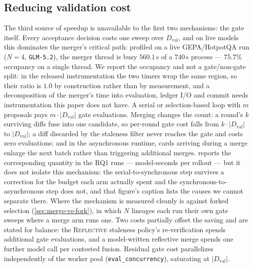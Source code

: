 \documentclass{article}
\newcommand{\code}[1]{\texttt{#1}}
\newcommand{\Dval}{D_{\mathrm{val}}}
\begin{document}
\subsection{Reducing validation cost}
\label{sec:lever-val}
The third source of speedup is unavailable to the first two mechanisms: the gate itself. Every acceptance decision costs one sweep over $\Dval$, and on live models this dominates the merger's critical path: profiled on a live GEPA/HotpotQA run ($N{=}4$, \code{GLM-5.2}), the merger thread is busy $560.1$\,s of a $740$\,s process --- $75.7\%$ occupancy on a single thread. We report the occupancy and not a gate/non-gate split: in the released instrumentation the two timers wrap the same region, so their ratio is $1.0$ by construction rather than by measurement, and a decomposition of the merger's time into evaluation, ledger I/O and commit needs instrumentation this paper does not have. A serial or selection-based loop with $m$ proposals pays $m \cdot |\Dval|$ gate evaluations. Merging changes the count: a round's $k$ surviving diffs fuse into one candidate, so per-round gate cost falls from $k \cdot |\Dval|$ to $|\Dval|$; a diff discarded by the staleness filter never reaches the gate and costs zero evaluations; and in the asynchronous runtime, cards arriving during a merge enlarge the next batch rather than triggering additional merges.  reports the corresponding quantity in the RQ1 runs --- model-seconds per rollout --- but it does not isolate this mechanism: the serial-to-synchronous step survives a correction for the budget each arm actually spent and the synchronous-to-asynchronous step does not, and that figure's caption lists the causes we cannot separate there. Where the mechanism is measured cleanly is against forked selection (\cref{sec:merge-vs-fork}), in which $N$ lineages each run their own gate sweeps where a merge arm runs one. Two costs partially offset the saving and are stated for balance: the \textsc{Reflective} staleness policy's re-verification spends additional gate evaluations, and a model-written reflective merge spends one further model call per contested fusion. Residual gate cost parallelizes independently of the worker pool (\code{eval\_concurrency}), saturating at $|\Dval|$.
\end{document}
